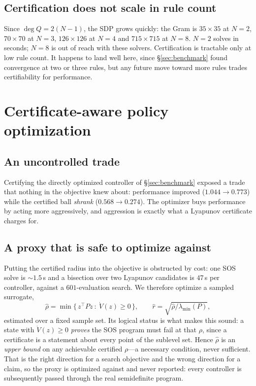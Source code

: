 \documentclass[11pt]{article}
\theoremstyle{plain}
\theoremstyle{definition}
\newcommand{\Vdot}{\dot{V}}
\begin{document}
\subsection{Certification does not scale in rule count}

Since $\deg Q=2(N-1)$, the SDP grows quickly: the Gram is $35\times35$ at
$N=2$, $70\times70$ at $N=3$, $126\times126$ at $N=4$ and $715\times715$ at
$N=8$. $N=2$ solves in seconds; $N=8$ is out of reach with these solvers.
Certification is tractable only at low rule count. It happens to land well here,
since \S\ref{sec:benchmark} found convergence at two or three rules, but any
future move toward more rules trades certifiability for performance.

\section{Certificate-aware policy optimization}
\label{sec:aware}

\subsection{An uncontrolled trade}

Certifying the directly optimized controller of \S\ref{sec:benchmark} exposed a
trade that nothing in the objective knew about: performance improved
($1.044\to0.773$) while the certified ball \emph{shrank} ($0.568\to0.274$). The
optimizer buys performance by acting more aggressively, and aggression is
exactly what a Lyapunov certificate charges for.

\subsection{A proxy that is safe to optimize against}

Putting the certified radius into the objective is obstructed by cost: one SOS
solve is ${\sim}1.5$\,s and a bisection over two Lyapunov candidates is $47$\,s
per controller, against a $601$-evaluation search. We therefore optimize a
sampled surrogate,
\begin{equation}
\hat\rho=\min\{\,z^{\top}Pz\ :\ \Vdot(z)\ge0\,\},
\qquad \hat r=\sqrt{\hat\rho/\lambda_{\min}(P)},
\label{eq:proxy}
\end{equation}
estimated over a fixed sample set. Its logical status is what makes this sound:
a state with $\Vdot(z)\ge0$ \emph{proves} the SOS program must fail at that
$\rho$, since a certificate is a statement about every point of the sublevel
set. Hence $\hat\rho$ is an \emph{upper bound} on any achievable certified
$\rho$---a necessary condition, never sufficient. That is the right direction
for a search objective and the wrong direction for a claim, so the proxy is
optimized against and never reported: every controller is subsequently passed
through the real semidefinite program.
\end{document}
